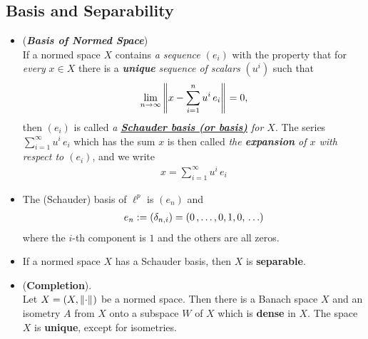 \documentclass[11pt]{article}
\begin{document}
\subsection{Basis and Separability}
\begin{itemize}
\item \begin{definition} (\emph{\textbf{Basis of Normed Space}})\\
If a normed space $X$ contains \emph{a sequence $(e_i)$} with the property that for \emph{every} $x \in X$ there is a \emph{\textbf{unique}} \emph{sequence of scalars} $(u^i)$ such that
\begin{align}
\lim\limits_{n\rightarrow \infty}\left\|x - \sum_{i=1}^{n}u^i\,e_i\right\|_{} = 0, \label{eqn: normed_space_schauder_basis}
\end{align}
then $(e_i)$ is called \emph{a \underline{\textbf{Schauder basis (or basis)}} for $X$}. The series $\sum_{i=1}^{\infty}u^i\,e_i$ which has the sum $x$ is then called \emph{the \textbf{expansion} of $x$ with respect to $(e_i)$}, and we write
\begin{align*}
x = \sum_{i=1}^{\infty}u^i\,e_i
\end{align*}
\end{definition}

\item \begin{example}
The (Schauder) basis of $\ell^{p}$ is $(e_n)$ and 
\begin{align*}
e_n := (\delta_{n,i}) = (0 \,{,}\ldots{,}\, 0, 1, 0, \,\ldots)
\end{align*}  where the $i$-th component is $1$ and the others are all zeros.
\end{example}

\item \begin{proposition}
If a normed space $X$ has a Schauder basis, then $X$ is \textbf{separable}.
\end{proposition}

\item \begin{theorem} (\textbf{Completion}). \citep{kreyszig1989introductory} \\
Let $X = (X, \left\|\cdot\right\|_{})$ be a normed space. Then there is a Banach space $X$ and an isometry $A$ from $X$ onto a
subspace $W$ of $X$ which is \textbf{dense} in $X$. The space $X$ is \textbf{unique}, except for isometries.
\end{theorem}
\end{itemize}
\end{document}
